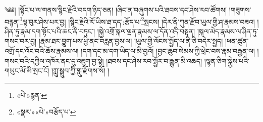 ༄༅། །སྟོང་པ་ལ་གནས་སྙིང་རྗེའི་བདག་ཉིད་ཅན། །ཞིང་ན་བཞུགས་པའི་ཐབས་དང་ཤེས་རབ་ཚོགས། །གཟུགས་བརྙན་\footnote{«པེ་»རྙན་}ལྟ་བུར་ཤེས་པར་བྱ། །སྙིང་རྗེའི་རོ་ཡིས་ཐ་དད་:རྩོད་པ་\footnote{«སྣར་»«པེ་»བརྩོད་པ་}སྤངས། །དེར་ནི་ཀུན་རྫོབ་ཡུལ་གྱི་ཤ་རྣམས་བཟའ། །ཤིན་ཏུ་རྣམ་དག་སྟོང་པའི་ཆང་ནི་བཏུང་། །སྐྱེ་འགྲོ་སྐལ་ལྡན་རྣམས་ལ་དོན་འདི་བསྟན། །སྐལ་མེད་རྣམས་ལ་ཤིན་ཏུ་གསང་བར་བྱ། །རྣམ་ཐར་བྱུག་པས་ཕྱི་ནང་བརླན་བྱས་ལ། །ཡུལ་གྱི་ལོངས་སྤྱོད་ལ་ནི་ཅི་བདེར་སྤྱད། །ཕན་ཚུན་འགྲོ་དང་འོང་བའི་ཆོས་རྣམས་ལ། །དག་དང་མ་དག་ཡིད་ལ་མི་བྱའོ། །བྱང་ཆུབ་སེམས་ཀྱི་ཕྲེང་བས་རྣམ་བརྒྱན་ལ། །གསང་བའི་དཀྱིལ་འཁོར་ནང་དུ་འཇུག་བྱ་སྟེ། །ཐབས་དང་ཤེས་རབ་སྦྱོར་བ་རྒྱུན་མི་འཆད། །ལྷན་ཅིག་སྐྱེས་པའི་གཡུང་མོ་མི་སྤང་ངོ། །ཀླུ་སྒྲུབ་ཀྱི་གླུ་རྫོགས་སོ། ། 